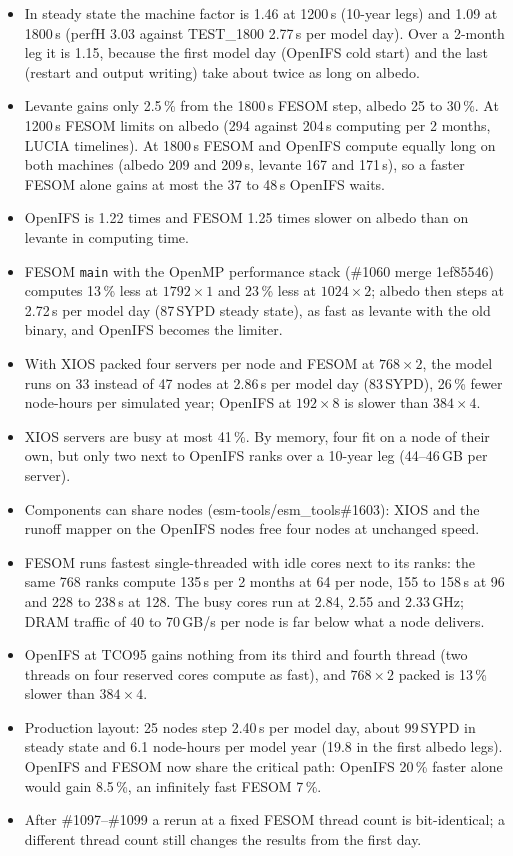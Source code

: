 \documentclass[11pt,a4paper]{article}
\begin{document}
\begin{itemize}
\item In steady state the machine factor is 1.46 at 1200\,s (10-year legs) and 1.09 at 1800\,s (perfH 3.03 against TEST\_1800 2.77\,s per model day). Over a 2-month leg it is 1.15, because the first model day (OpenIFS cold start) and the last (restart and output writing) take about twice as long on albedo.
\item Levante gains only 2.5\,\% from the 1800\,s FESOM step, albedo 25 to 30\,\%. At 1200\,s FESOM limits on albedo (294 against 204\,s computing per 2 months, LUCIA timelines). At 1800\,s FESOM and OpenIFS compute equally long on both machines (albedo 209 and 209\,s, levante 167 and 171\,s), so a faster FESOM alone gains at most the 37 to 48\,s OpenIFS waits.
\item OpenIFS is 1.22 times and FESOM 1.25 times slower on albedo than on levante in computing time.
\item FESOM \texttt{main} with the OpenMP performance stack (\#1060 merge 1ef85546) computes 13\,\% less at $1792\times1$ and 23\,\% less at $1024\times2$; albedo then steps at 2.72\,s per model day (87\,SYPD steady state), as fast as levante with the old binary, and OpenIFS becomes the limiter.
\item With XIOS packed four servers per node and FESOM at $768\times2$, the model runs on 33 instead of 47 nodes at 2.86\,s per model day (83\,SYPD), 26\,\% fewer node-hours per simulated year; OpenIFS at $192\times8$ is slower than $384\times4$.
\item XIOS servers are busy at most 41\,\%. By memory, four fit on a node of their own, but only two next to OpenIFS ranks over a 10-year leg (44--46\,GB per server).
\item Components can share nodes (esm-tools/esm\_tools\#1603): XIOS and the runoff mapper on the OpenIFS nodes free four nodes at unchanged speed.
\item FESOM runs fastest single-threaded with idle cores next to its ranks: the same 768 ranks compute 135\,s per 2 months at 64 per node, 155 to 158\,s at 96 and 228 to 238\,s at 128. The busy cores run at 2.84, 2.55 and 2.33\,GHz; DRAM traffic of 40 to 70\,GB/s per node is far below what a node delivers.
\item OpenIFS at TCO95 gains nothing from its third and fourth thread (two threads on four reserved cores compute as fast), and $768\times2$ packed is 13\,\% slower than $384\times4$.
\item Production layout: 25 nodes step 2.40\,s per model day, about 99\,SYPD in steady state and 6.1 node-hours per model year (19.8 in the first albedo legs). OpenIFS and FESOM now share the critical path: OpenIFS 20\,\% faster alone would gain 8.5\,\%, an infinitely fast FESOM 7\,\%.
\item After \#1097--\#1099 a rerun at a fixed FESOM thread count is bit-identical; a different thread count still changes the results from the first day.
\end{itemize}
\end{document}
